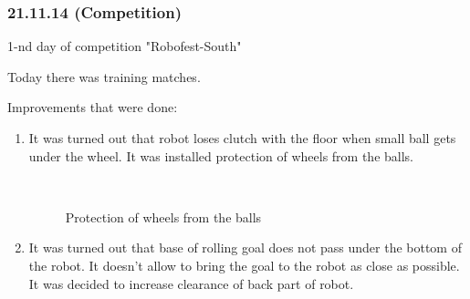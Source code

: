 \subsubsection{21.11.14 (Competition)}

\begin{center}
	1-nd day of competition "Robofest-South"
\end{center}
Today there was training matches.\newline

Improvements that were done:
\begin{enumerate}
	\item It was turned out that robot loses clutch with the floor when small ball gets under the wheel. It was installed protection of wheels from the balls.
	
	\begin{figure}[H]
		\begin{minipage}[h]{0.2\linewidth}
			\center  
		\end{minipage}
		\begin{minipage}[h]{0.6\linewidth}
			\caption{Protection of wheels from the balls}
		\end{minipage}
	\end{figure}
	
	\item It was turned out that base of rolling goal does not pass under the bottom of the robot. It doesn't allow to bring the goal to the robot as close as possible. It was decided to increase clearance of back part of robot.
	

\end{enumerate}
